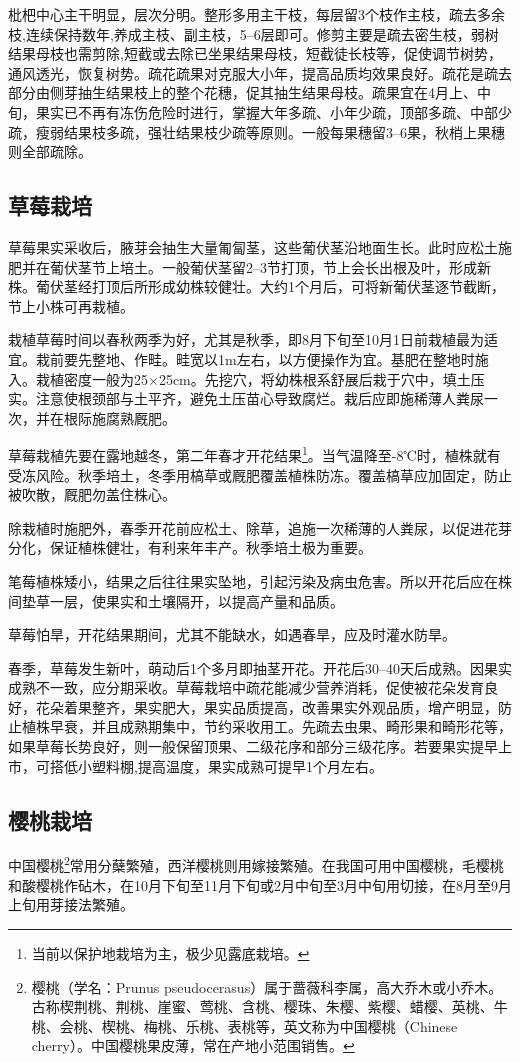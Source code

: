 \documentclass{ctexbook}
\begin{document}
枇杷中心主干明显，层次分明。整形多用主干枝，每层留3个枝作主枝，疏去多余枝,连续保持数年,养成主枝、副主枝，5--6层即可。修剪主要是疏去密生枝，弱树结果母枝也需剪除,短截或去除已坐果结果母枝，短截徒长枝等，促使调节树势，通风透光，恢复树势。疏花疏果对克服大小年，提高品质均效果良好。疏花是疏去部分由侧芽抽生结果枝上的整个花穗，促其抽生结果母枝。疏果宜在4月上、中旬，果实已不再有冻伤危险时进行，掌握大年多疏、小年少疏，顶部多疏、中部少疏，瘦弱结果枝多疏，强壮结果枝少疏等原则。一般每果穗留3--6果，秋梢上果穗则全部疏除。
\subsection{草莓栽培}
草莓果实采收后，腋芽会抽生大量匍匐茎，这些葡伏茎沿地面生长。此时应松土施肥并在葡伏茎节上培土。一般葡伏茎留2--3节打顶，节上会长出根及叶，形成新株。葡伏茎经打顶后所形成幼株较健壮。大约1个月后，可将新葡伏茎逐节截断，节上小株可再栽植。

栽植草莓时间以春秋两季为好，尤其是秋季，即8月下旬至10月1日前栽植最为适宜。栽前要先整地、作畦。畦宽以1m左右，以方便操作为宜。基肥在整地时施入。栽植密度一般为25$\times$25cm。先挖穴，将幼株根系舒展后栽于穴中，填土压实。注意使根颈部与土平齐，避免土压苗心导致腐烂。栽后应即施稀薄人粪尿一次，并在根际施腐熟厩肥。

草莓栽植先要在露地越冬，第二年春才开花结果\footnote{当前以保护地栽培为主，极少见露底栽培。}。当气温降至-8℃时，植株就有受冻风险。秋季培土，冬季用槁草或厩肥覆盖植株防冻。覆盖槁草应加固定，防止被吹散，厩肥勿盖住株心。

除栽植时施肥外，春季开花前应松土、除草，追施一次稀薄的人粪尿，以促进花芽分化，保证植株健壮，有利来年丰产。秋季培土极为重要。

笔莓植株矮小，结果之后往往果实坠地，引起污染及病虫危害。所以开花后应在株间垫草一层，使果实和土壤隔开，以提高产量和品质。

草莓怕旱，开花结果期间，尤其不能缺水，如遇春旱，应及时灌水防旱。

春季，草莓发生新叶，萌动后1个多月即抽茎开花。开花后30--40天后成熟。因果实成熟不一致，应分期采收。草莓栽培中疏花能减少营养消耗，促使被花朵发育良好，花朵着果整齐，果实肥大，果实品质提高，改善果实外观品质，增产明显，防止植株早衰，并且成熟期集中，节约采收用工。先疏去虫果、畸形果和畸形花等，如果草莓长势良好，则一般保留顶果、二级花序和部分三级花序。若要果实提早上市，可搭低小塑料棚,提高温度，果实成熟可提早1个月左右。
\subsection{樱桃栽培}
中国樱桃\footnote{樱桃（学名：Prunus pseudocerasus）属于蔷薇科李属，高大乔木或小乔木。古称楔荆桃、荆桃、崖蜜、莺桃、含桃、樱珠、朱樱、紫樱、蜡樱、英桃、牛桃、会桃、楔桃、梅桃、乐桃、表桃等，英文称为中国樱桃（Chinese cherry）。中国樱桃果皮薄，常在产地小范围销售。}常用分蘖繁殖，西洋樱桃则用嫁接繁殖。在我国可用中国樱桃，毛樱桃和酸樱桃作砧木，在10月下旬至11月下旬或2月中旬至3月中旬用切接，在8月至9月上旬用芽接法繁殖。
\end{document}
